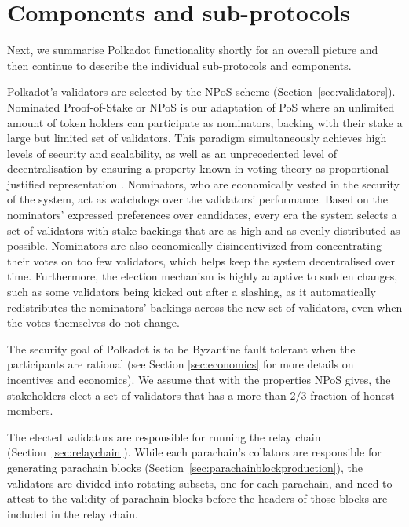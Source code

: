 \documentclass{article}
\begin{document}
%
\section{Components and sub-protocols}\label{sec:components}
Next, we summarise Polkadot functionality shortly for an overall picture and then continue to describe the individual sub-protocols and components. %

Polkadot's validators are selected by the NPoS scheme (Section~\ref{sec:validators}). Nominated Proof-of-Stake or NPoS is our adaptation of PoS where an unlimited amount of token holders can participate as nominators, backing with their stake a large but limited set of validators. This paradigm simultaneously achieves high levels of security and scalability, as well as an unprecedented level of decentralisation by ensuring a property known in voting theory as proportional justified representation \cite{sanchez2017proportional, brill2017phragmen}. Nominators, who are economically vested in the security of the system, act as watchdogs over the validators' performance. Based on the nominators' expressed preferences over candidates, every era the system selects a set of validators with stake backings that are as high and as evenly distributed as possible. Nominators are also economically disincentivized from concentrating their votes on too few validators, which helps keep the system decentralised over time. Furthermore, the election mechanism is highly adaptive to sudden changes, such as some validators being kicked out after a slashing, as it automatically redistributes the nominators' backings across the new set of validators, even when the votes themselves do not change.

The security goal of Polkadot is to be Byzantine fault tolerant when the participants are rational (see Section \ref{sec:economics} for more details on incentives and economics). We assume that with the properties NPoS gives, the stakeholders elect a set of validators that has a more than $2/3$ fraction of honest members.

The elected validators are responsible for running the relay chain (Section~\ref{sec:relaychain}). While each parachain's collators are responsible for generating parachain blocks (Section~\ref{sec:parachainblockproduction}), the validators are divided into rotating subsets, one for each parachain, and need to attest to the validity of parachain blocks before the headers of those blocks are included in the relay chain.
\end{document}

